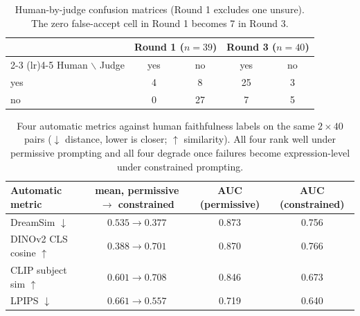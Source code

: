 \documentclass[10pt]{article}
\begin{document}
\begin{table}[htbp]
\centering
\small
\begin{tabular}{lcccc}
\toprule
 & \multicolumn{2}{c}{Round 1 ($n=39$)} & \multicolumn{2}{c}{Round 3 ($n=40$)} \\
\cmidrule(lr){2-3} \cmidrule(lr){4-5}
Human $\backslash$ Judge & yes & no & yes & no \\
\midrule
yes & 4 & 8 & 25 & 3 \\
no & 0 & 27 & 7 & 5 \\
\bottomrule
\end{tabular}
\caption{Human-by-judge confusion matrices (Round 1 excludes one unsure). The zero false-accept cell in Round 1 becomes 7 in Round 3.}
\label{tab:confusion}
\end{table}

\begin{table}[htbp]
\centering
\small
\begin{tabular}{lccc}
\toprule
Automatic metric & mean, permissive $\rightarrow$ constrained & AUC (permissive) & AUC (constrained) \\
\midrule
DreamSim $\downarrow$ & $0.535 \rightarrow 0.377$ & 0.873 & 0.756 \\
DINOv2 CLS cosine $\uparrow$ & $0.388 \rightarrow 0.701$ & 0.870 & 0.766 \\
CLIP subject sim $\uparrow$ & $0.601 \rightarrow 0.708$ & 0.846 & 0.673 \\
LPIPS $\downarrow$ & $0.661 \rightarrow 0.557$ & 0.719 & 0.640 \\
\bottomrule
\end{tabular}
\caption{Four automatic metrics against human faithfulness labels on the same $2{\times}40$ pairs ($\downarrow$ distance, lower is closer; $\uparrow$ similarity). All four rank well under permissive prompting and all four degrade once failures become expression-level under constrained prompting.}
\label{tab:metricfamily}
\end{table}
\end{document}
